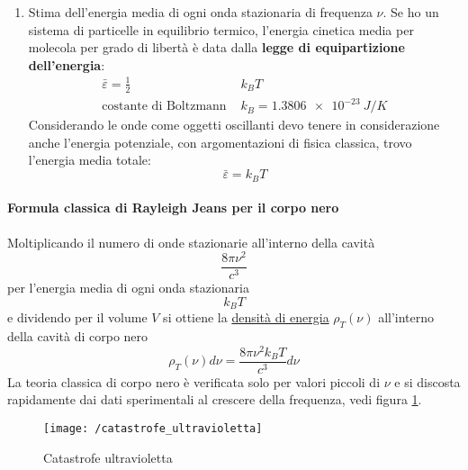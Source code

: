 \begin{enumerate}[label=\Roman{*}.]
\item Stima dell'energia media di ogni onda stazionaria di frequenza $\nu$.
Se ho un sistema di particelle in equilibrio termico, l'energia cinetica media per molecola per grado di libertà è data dalla \textbf{legge di equipartizione dell'energia}:
\begin{equation}
\begin{split}
\bar \varepsilon = \frac{ 1}{2 } & k_B T \\
\mbox{costante di Boltzmann } & k_B = \SI{1.3806e-23}{J/K}
\end{split}
\end{equation}
Considerando le onde come oggetti oscillanti devo tenere in considerazione anche l'energia potenziale, con argomentazioni di fisica classica, trovo l'energia media totale:
\begin{equation}
\bar \varepsilon = k_B T
\end{equation}
\end{enumerate}

\paragraph{Formula classica di Rayleigh Jeans per il corpo nero}
Moltiplicando il numero di onde stazionarie all'interno della cavità 
$$\frac{8 \pi \nu^2}{c^3}$$
per l'energia media di ogni onda stazionaria
$$k_BT$$
e dividendo per il volume $V$ si ottiene la \underline{densità di energia} $\rho_T(\nu)$ all'interno della cavità di corpo nero
\begin{equation}
\rho_T(\nu)d\nu = \frac{8 \pi \nu^2 k_B T }{c^3}d\nu
\end{equation}
La teoria classica di corpo nero è verificata solo per valori piccoli di $\nu$ e si discosta rapidamente dai dati sperimentali al crescere della frequenza, vedi figura \ref{catastrofeUV}.
\begin{figure}[h]
\centering
\texttt{[image: /catastrofe\_ultravioletta]}
\caption{Catastrofe ultravioletta}
\label{catastrofeUV}
\end{figure}


